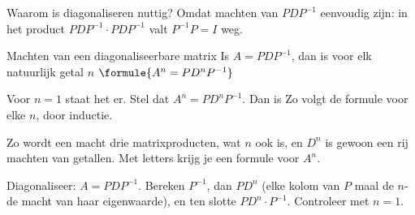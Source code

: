 Waarom is diagonaliseren nuttig? Omdat machten van $PDP^{-1}$ eenvoudig zijn: in het product $PDP^{-1} \cdot PDP^{-1}$ valt $P^{-1}P = I$ weg.

\begin{theorie}
\begin{stelling}{Machten van een diagonaliseerbare matrix}
Is $A = PDP^{-1}$, dan is voor elk natuurlijk getal $n$ \qquad $\formule{A^n = PD^nP^{-1}}$
\end{stelling}

\begin{bewijs}
Voor $n = 1$ staat het er. Stel dat $A^n = PD^nP^{-1}$. Dan is
Zo volgt de formule voor elke $n$, door inductie.
\end{bewijs}
\end{theorie}

Zo wordt een macht drie matrixproducten, wat $n$ ook is, en $D^n$ is gewoon een rij machten van getallen. Met letters krijg je een formule voor $A^n$.


\begin{werkwijze}
Diagonaliseer: $A = PDP^{-1}$. Bereken $P^{-1}$, dan $PD^n$ (elke kolom van $P$ maal de $n$-de macht van haar eigenwaarde), en ten slotte $PD^n \cdot P^{-1}$. Controleer met $n = 1$.
\end{werkwijze}

